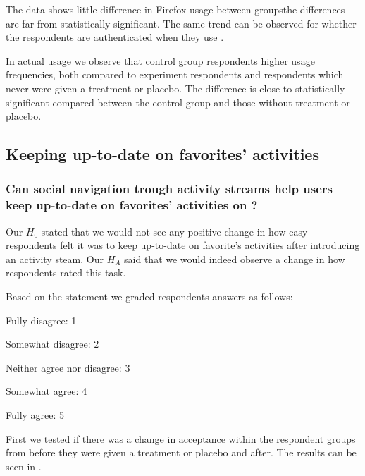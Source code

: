 The data shows little difference in Firefox usage between
groups\dash{}the differences are
far from statistically significant. The same trend can be observed for
whether the respondents are authenticated when they use \urort{}.

In actual \urort{} usage we observe that control group respondents higher
usage frequencies, both compared to experiment respondents and respondents
which never were given a treatment or placebo. The difference is close
to statistically significant compared between the control group and those
without treatment or placebo.

\subsection{Keeping up-to-date on favorites' activities}

\subsubsection{%
  Can social navigation trough activity streams help users keep
  up-to-date on favorites' activities on \urort{}?
}

Our $H_0$ stated that we would not see any positive change in how easy
respondents felt it was to keep up-to-date on favorite's activities
after introducing an activity steam. Our $H_A$ said that we
would indeed observe a change in how respondents rated this task.

Based on the statement
 we graded respondents answers as follows: 

\begin{items}
  \item Fully disagree: 1
  \item Somewhat disagree: 2
  \item Neither agree nor disagree: 3
  \item Somewhat agree: 4
  \item Fully agree: 5
\end{items}

First we tested if there was a change in acceptance within the respondent
groups from before they were given a treatment or placebo and after.
The results can be seen in
.

